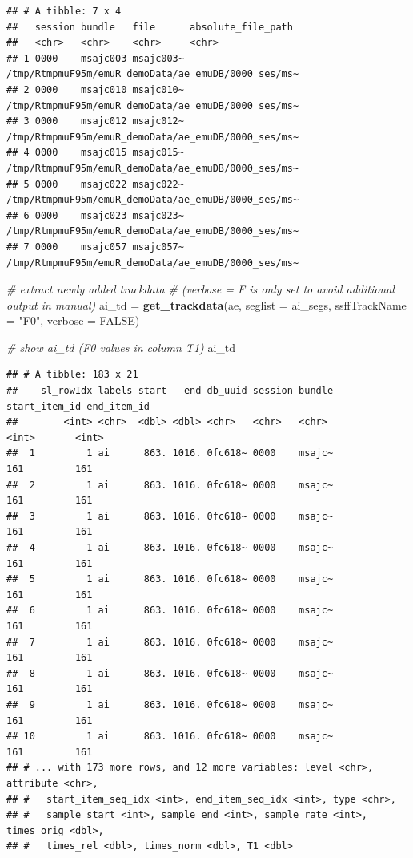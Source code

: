 \documentclass[]{book}
\newenvironment{Shaded}{\begin{snugshade}}{\end{snugshade}}
\newcommand{\CommentTok}[1]{\textcolor[rgb]{0.56,0.35,0.01}{\textit{#1}}}
\newcommand{\DataTypeTok}[1]{\textcolor[rgb]{0.13,0.29,0.53}{#1}}
\newcommand{\KeywordTok}[1]{\textcolor[rgb]{0.13,0.29,0.53}{\textbf{#1}}}
\newcommand{\NormalTok}[1]{#1}
\newcommand{\OtherTok}[1]{\textcolor[rgb]{0.56,0.35,0.01}{#1}}
\newcommand{\StringTok}[1]{\textcolor[rgb]{0.31,0.60,0.02}{#1}}
\begin{document}
\begin{verbatim}
## # A tibble: 7 x 4
##   session bundle   file      absolute_file_path                                 
##   <chr>   <chr>    <chr>     <chr>                                              
## 1 0000    msajc003 msajc003~ /tmp/RtmpmuF95m/emuR_demoData/ae_emuDB/0000_ses/ms~
## 2 0000    msajc010 msajc010~ /tmp/RtmpmuF95m/emuR_demoData/ae_emuDB/0000_ses/ms~
## 3 0000    msajc012 msajc012~ /tmp/RtmpmuF95m/emuR_demoData/ae_emuDB/0000_ses/ms~
## 4 0000    msajc015 msajc015~ /tmp/RtmpmuF95m/emuR_demoData/ae_emuDB/0000_ses/ms~
## 5 0000    msajc022 msajc022~ /tmp/RtmpmuF95m/emuR_demoData/ae_emuDB/0000_ses/ms~
## 6 0000    msajc023 msajc023~ /tmp/RtmpmuF95m/emuR_demoData/ae_emuDB/0000_ses/ms~
## 7 0000    msajc057 msajc057~ /tmp/RtmpmuF95m/emuR_demoData/ae_emuDB/0000_ses/ms~
\end{verbatim}

\begin{Shaded}
\begin{Highlighting}[]
\CommentTok{# extract newly added trackdata}
\CommentTok{# (verbose = F is only set to avoid additional output in manual)}
\NormalTok{ai_td =}\StringTok{ }\KeywordTok{get_trackdata}\NormalTok{(ae,}
                      \DataTypeTok{seglist =}\NormalTok{ ai_segs,}
                      \DataTypeTok{ssffTrackName =} \StringTok{"F0"}\NormalTok{,}
                      \DataTypeTok{verbose =} \OtherTok{FALSE}\NormalTok{)}

\CommentTok{# show ai_td (F0 values in column T1)}
\NormalTok{ai_td}
\end{Highlighting}
\end{Shaded}

\begin{verbatim}
## # A tibble: 183 x 21
##    sl_rowIdx labels start   end db_uuid session bundle start_item_id end_item_id
##        <int> <chr>  <dbl> <dbl> <chr>   <chr>   <chr>          <int>       <int>
##  1         1 ai      863. 1016. 0fc618~ 0000    msajc~           161         161
##  2         1 ai      863. 1016. 0fc618~ 0000    msajc~           161         161
##  3         1 ai      863. 1016. 0fc618~ 0000    msajc~           161         161
##  4         1 ai      863. 1016. 0fc618~ 0000    msajc~           161         161
##  5         1 ai      863. 1016. 0fc618~ 0000    msajc~           161         161
##  6         1 ai      863. 1016. 0fc618~ 0000    msajc~           161         161
##  7         1 ai      863. 1016. 0fc618~ 0000    msajc~           161         161
##  8         1 ai      863. 1016. 0fc618~ 0000    msajc~           161         161
##  9         1 ai      863. 1016. 0fc618~ 0000    msajc~           161         161
## 10         1 ai      863. 1016. 0fc618~ 0000    msajc~           161         161
## # ... with 173 more rows, and 12 more variables: level <chr>, attribute <chr>,
## #   start_item_seq_idx <int>, end_item_seq_idx <int>, type <chr>,
## #   sample_start <int>, sample_end <int>, sample_rate <int>, times_orig <dbl>,
## #   times_rel <dbl>, times_norm <dbl>, T1 <dbl>
\end{verbatim}
\end{document}
